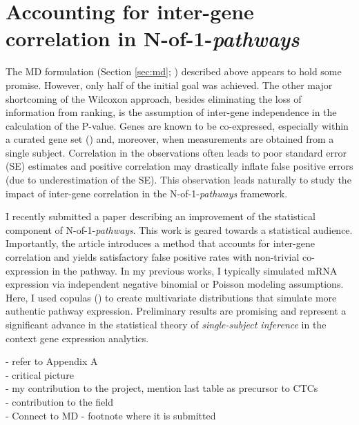 \chapter{Accounting for inter-gene correlation in N-of-1-\emph{pathways}} \label{Chap:ct}

The MD formulation (Section \ref{sec:md}; \cite{Schissler2015}) described above appears to hold some promise. However, only half of the initial goal was achieved. The other major shortcoming of the Wilcoxon approach, besides eliminating the loss of information from ranking, is the assumption of inter-gene independence in the calculation of the P-value. Genes are known to be co-expressed, especially within a curated gene set (\cite{Tamayo2016}) and, moreover, when measurements are obtained from a single subject. Correlation in the observations often leads to poor standard error (SE) estimates and positive correlation may drastically inflate false positive errors (due to underestimation of the SE). This observation leads naturally to study the impact of inter-gene correlation in the N-of-1-\emph{pathways} framework.

I recently submitted a paper describing an improvement of the statistical component of N-of-1-\emph{pathways}. This work is geared towards a statistical audience. Importantly, the article introduces a method that accounts for inter-gene correlation and yields satisfactory false positive rates with non-trivial co-expression in the pathway. In my previous works, I typically simulated mRNA expression via independent negative binomial or Poisson modeling assumptions. Here, I used copulas (\cite{Genest2007,Yan2007}) to create multivariate distributions that simulate more authentic pathway expression. Preliminary results are promising and represent a significant advance in the statistical theory of \emph{single-subject inference} in the context gene expression analytics.

- refer to Appendix A \\
- critical picture\\
- my contribution to the project, mention last table as precursor to CTCs\\ 
- contribution to the field\\
- Connect to MD
- footnote where it is submitted